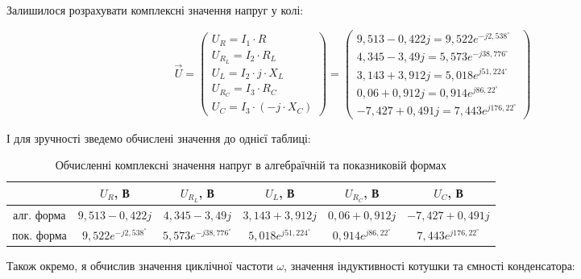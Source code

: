 \documentclass[12pt,a4paper]{article}
\begin{document}
    Залишилося розрахувати комплексні значення напруг у колі:

    \[
    \vec{U} = 
    \begin{pmatrix}
    U_R = I_1 \cdot R \\
    U_{R_L} = I_2 \cdot R_L \\
    U_L = I_2 \cdot j \cdot X_L \\
    U_{R_C} = I_3 \cdot R_C \\
    U_C = I_3 \cdot (-j \cdot X_C) 
    \end{pmatrix} =
    \begin{pmatrix}
    9{,}513 -0{,}422j = 9{,}522 e^{-j2{,}538^\circ} \\
    4{,}345 -3{,}49j = 5{,}573 e^{-j38{,}776^\circ} \\
    3{,}143 + 3{,}912j = 5{,}018 e^{j51{,}224^\circ} \\
    0{,}06 + 0{,}912j = 0{,}914 e^{j86{,}22^\circ} \\
    -7{,}427 + 0{,}491j = 7{,}443 e^{j176{,}22^\circ}
    \end{pmatrix}
    \]

    І для зручності зведемо обчислені значення до однієї таблиці:

    \begin{table}[h]
    \centering
    \renewcommand{\arraystretch}{1.35}
    \begin{tabular}{|c|c|c|c|c|c|}
    \hline
    & $U_{R}$, В & $U_{R_L}$, В & $U_{L}$, В & $U_{R_C}$, В & $U_{C}$, В \\
    \cline{2-6}
    \hline
    алг. форма
    & $\displaystyle 9{,}513 -0{,}422j$
    & $\displaystyle 4{,}345 -3{,}49j$
    & $\displaystyle 3{,}143 + 3{,}912j$
    & $\displaystyle 0{,}06 + 0{,}912j$
    & $\displaystyle -7{,}427 + 0{,}491j$\\
    \hline
    пок. форма
    & $\displaystyle 9{,}522 e^{-j2{,}538^\circ}$
    & $\displaystyle 5{,}573 e^{-j38{,}776^\circ}$
    & $\displaystyle 5{,}018 e^{j51{,}224^\circ}$
    & $\displaystyle 0{,}914 e^{j86{,}22^\circ}$
    & $\displaystyle 7{,}443 e^{j176{,}22^\circ}$ \\
    \hline
    \end{tabular}
    \caption{Обчисленні комплексні значення напруг в алгебраїчній та показниковій формах}
    \end{table}

    Також окремо, я обчислив значення циклічної частоти $\omega$, значення індуктивності котушки та ємності конденсатора:
\end{document}

